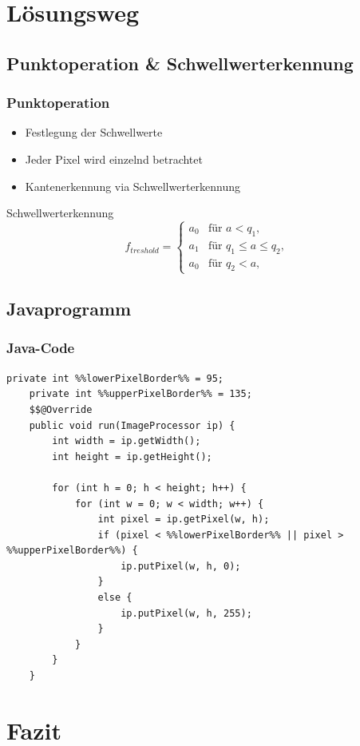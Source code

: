 \documentclass[12pt]{beamer}
\begin{document}
\section{Lösungsweg}
\subsection{Punktoperation \& Schwellwerterkennung}

\begin{frame}
\frametitle{Punktoperation}
\begin{itemize}
	\item Festlegung der Schwellwerte
	\item Jeder Pixel wird einzelnd betrachtet
	\item Kantenerkennung via Schwellwerterkennung
\end{itemize}
\begin{block}{Schwellwerterkennung}	
	\begin{equation*}
		f_{treshold}=
		\begin{cases}
			a_0   			& \text{für } a < q_1,\\
			a_1        		& \text{für } q_1 \leq a \leq q_2, \\
			a_0        		& \text{für } q_2 < a,
		\end{cases}
	\end{equation*}
\end{block}
\end{frame}
\subsection{Javaprogramm}

\begin{frame}[fragile]
	\frametitle{Java-Code}
	\begin{lstlisting}[basicstyle=\scriptsize]
	private int %%lowerPixelBorder%% = 95;
	private int %%upperPixelBorder%% = 135;	
	$$@Override
	public void run(ImageProcessor ip) {
		int width = ip.getWidth();
		int height = ip.getHeight();
		
		for (int h = 0; h < height; h++) {
			for (int w = 0; w < width; w++) {
				int pixel = ip.getPixel(w, h);
				if (pixel < %%lowerPixelBorder%% || pixel > %%upperPixelBorder%%) {
					ip.putPixel(w, h, 0);
				}
				else {
					ip.putPixel(w, h, 255);
				}
			}
		}	
	}
	\end{lstlisting}
\end{frame}

\section{Fazit}
\end{document}
